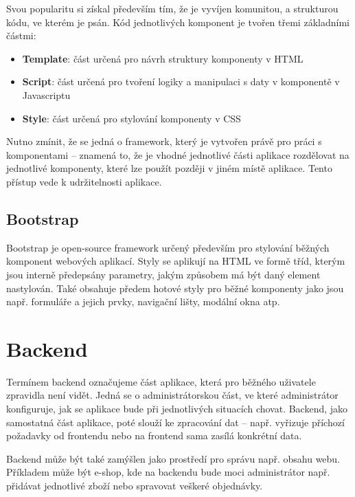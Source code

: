 	Svou popularitu si získal především tím, že je vyvíjen komunitou, a strukturou kódu, ve kterém je psán. Kód jednotlivých komponent je tvořen třemi základními částmi:
	
	\begin{itemize}
		\item \textbf{Template}: část určená pro návrh struktury komponenty v HTML
		\item \textbf{Script}: část určená pro tvoření logiky a manipulaci s daty v komponentě v Javascriptu
		\item \textbf{Style}: část určená pro stylování komponenty v CSS
	\end{itemize}

	Nutno zmínit, že se jedná o framework, který je vytvořen právě pro práci s komponentami – znamená to, že je vhodné jednotlivé části aplikace rozdělovat na jednotlivé komponenty, které lze použít později v jiném místě aplikace. Tento přístup vede k udržitelnosti aplikace. \cite{VueJSSyntax} \cite{VueJS2}
	
	\subsection{Bootstrap}
	Bootstrap je open-source framework určený především pro stylování běžných komponent webových aplikací. Styly se aplikují na HTML ve formě tříd, kterým jsou interně předepsány parametry, jakým způsobem má být daný element nastylován. Také obsahuje předem hotové styly pro běžné komponenty jako jsou např. formuláře a jejich prvky, navigační lišty, modální okna atp. \cite{Bootstrap1}  \cite{Bootstrap2}  \cite{Bootstrap3}

\section{Backend}
Termínem backend označujeme část aplikace, která pro běžného uživatele zpravidla není vidět. Jedná se o administrátorskou část, ve které administrátor konfiguruje, jak se aplikace bude při jednotlivých situacích chovat. Backend, jako samostatná část aplikace, poté slouží ke zpracování dat – např. vyřizuje příchozí požadavky od frontendu nebo na frontend sama zasílá konkrétní data.

Backend může být také zamýšlen jako prostředí pro správu např. obsahu webu. Příkladem může být e-shop, kde na backendu bude moci administrátor např. přidávat jednotlivé zboží nebo spravovat veškeré objednávky.  \cite{BE1} \cite{BE2}
	
